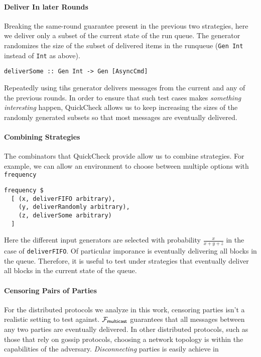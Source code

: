 \paragraph{Deliver In later Rounds}
Breaking the same-round guarantee present in the previous two strategies, here we deliver only a subset of the current state of the run queue.
The generator randomizes the size of the subset of delivered items in the runqueue (\texttt{Gen Int} instead of \texttt{Int} as above).
\begin{lstlisting}
deliverSome :: Gen Int -> Gen [AsyncCmd]
\end{lstlisting}
Repeatedly using tihs generator delivers messages from the current and any of the previous rounds. 
In order to ensure that such test cases makes \emph{something interesting} happen, QuickCheck allows us to keep increasing the sizes of the randomly generated subsets so that
most messages are eventually delivered. 

\paragraph{Combining Strategies}
The combinators that QuickCheck provide allow us to combine strategies.
For example, we can allow an environment to choose between multiple options with \texttt{frequency}
\begin{lstlisting}
frequency $ 
  [ (x, deliverFIFO arbitrary),
    (y, deliverRandomly arbitrary),
    (z, deliverSome arbitrary)
  ]
\end{lstlisting} 
Here the different input generators are selected with probability $\frac{x}{x+y+z}$ in the case of \texttt{deliverFIFO}.
Of particular imporance is eventually delivering all blocks in the queue. 
Therefore, it is useful to test under strategies that eventually deliver all blocks in the current state of the queue. 

\paragraph{Censoring Pairs of Parties}
For the distributed protocols we analyze in this work, censoring parties isn't a realistic setting to test against.
$\mathcal{F}_{{\mathsf {multicast}}}$ guarantees that all messages between any two parties are eventually delivered.
In other distributed protocols, such as those that rely on gossip protocols, choosing a network topology is within the capabilities of the adversary.
\emph{Disconnecting} parties is easily achieve in \us {}


